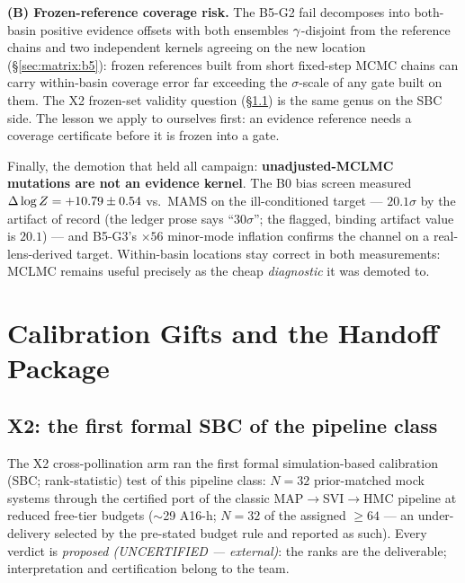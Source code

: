 {\bf (B) Frozen-reference coverage risk.} The B5-G2 fail decomposes into
both-basin positive evidence offsets with both ensembles
$\gamma$-disjoint from the reference chains and two independent kernels
agreeing on the new location (\S\ref{sec:matrix:b5}): frozen references
built from short fixed-step MCMC chains can carry within-basin coverage
error far exceeding the $\sigma$-scale of any gate built on them. The X2
frozen-set validity question (\S\ref{sec:gifts:x2}) is the same genus on
the SBC side. The lesson we apply to ourselves first: an evidence reference
needs a coverage certificate before it is frozen into a gate.

Finally, the demotion that held all campaign: {\bf unadjusted-MCLMC
mutations are not an evidence kernel}. The B0 bias screen measured
$\Delta\log Z=+10.79\pm0.54$ vs.\ MAMS on the ill-conditioned target ---
$20.1\sigma$ by the artifact of record (the ledger prose says ``$30\sigma$'';
the flagged, binding artifact value is
$20.1$) --- and B5-G3's $\times56$
minor-mode inflation confirms the channel on a real-lens-derived target.
Within-basin locations stay correct in both measurements: MCLMC remains
useful precisely as the cheap {\it diagnostic} it was demoted to.

\section{Calibration Gifts and the Handoff Package}
\label{sec:gifts}

\subsection{X2: the first formal SBC of the pipeline class}
\label{sec:gifts:x2}

The X2 cross-pollination arm ran the first formal simulation-based
calibration (SBC; rank-statistic) test of this pipeline class: $N{=}32$
prior-matched mock systems through the certified port of the classic
MAP$\to$SVI$\to$HMC pipeline at reduced free-tier budgets ($\sim$29 A16-h;
$N{=}32$ of the assigned $\ge64$ --- an under-delivery selected by the
pre-stated budget rule and reported as such). Every verdict is
{\it proposed (UNCERTIFIED --- external)}: the ranks are the deliverable;
interpretation and certification belong to the team.

